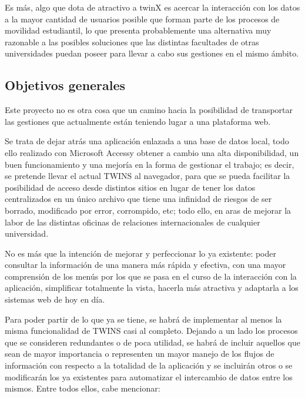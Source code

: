 Es más, algo que dota de atractivo a twinX es acercar la interacción con los datos a la mayor cantidad de usuarios posible que forman parte de los procesos de movilidad estudiantil, lo que presenta probablemente una alternativa muy razonable a las posibles soluciones que las distintas facultades de otras universidades puedan poseer para llevar a cabo sus gestiones en el mismo ámbito.

\subsection{Objetivos generales}

Este proyecto no es otra cosa que un camino hacia la posibilidad de transportar las gestiones que actualmente están teniendo lugar a una plataforma web.

Se trata de dejar atrás una aplicación enlazada a una base de datos local, todo ello realizado con Microsoft Access\textregistered y obtener a cambio una alta disponibilidad, un buen funcionamiento y una mejoría en la forma de gestionar el trabajo; es decir, se pretende llevar el actual TWINS al navegador, para que se pueda facilitar la posibilidad de acceso desde distintos sitios en lugar de tener los datos centralizados en un único archivo que tiene una infinidad de riesgos de ser borrado, modificado por error, corrompido, etc; todo ello, en aras de mejorar la labor de las distintas oficinas de relaciones internacionales de cualquier universidad.

No es más que la intención de mejorar y perfeccionar lo ya existente: poder consultar la información de una manera más rápida y efectiva, con una mayor comprensión de los menús por los que se pasa en el curso de la interacción con la aplicación, simplificar totalmente la vista, hacerla más atractiva y adaptarla a los sistemas web de hoy en día.

Para poder partir de lo que ya se tiene, se habrá de implementar al menos la misma funcionalidad de TWINS casi al completo. Dejando a un lado los procesos que se consideren redundantes o de poca utilidad, se habrá de incluir aquellos que sean de mayor importancia o representen un mayor manejo de los flujos de información con respecto a la totalidad de la aplicación y se incluirán otros o se modificarán los ya existentes para automatizar el intercambio de datos entre los mismos. Entre todos ellos, cabe mencionar:

